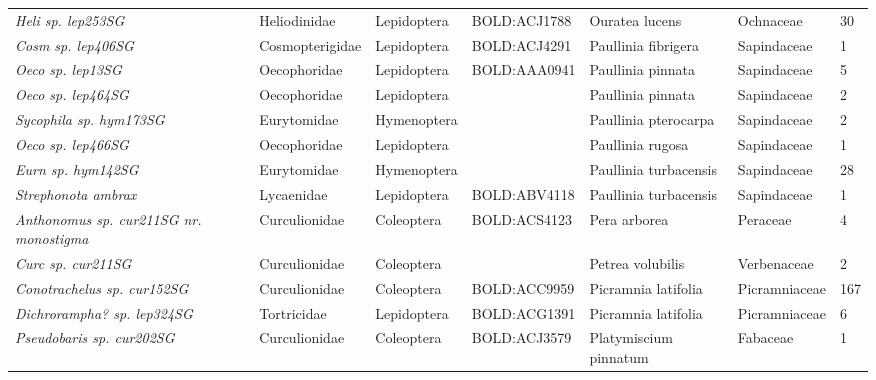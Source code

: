 \documentclass[11pt]{article}
\begin{document}
\begin{landscape}
\begin{longtable}{@{}lllllll@{}}
\textit{Heli sp. lep253SG}                            & Heliodinidae    & Lepidoptera  & BOLD:ACJ1788 & Ouratea lucens                     & Ochnaceae        & 30    \\
\textit{Cosm sp. lep406SG}                            & Cosmopterigidae & Lepidoptera  & BOLD:ACJ4291 & Paullinia fibrigera                & Sapindaceae      & 1     \\
\textit{Oeco sp. lep13SG}                             & Oecophoridae    & Lepidoptera  & BOLD:AAA0941 & Paullinia pinnata                  & Sapindaceae      & 5     \\
\textit{Oeco sp. lep464SG}                            & Oecophoridae    & Lepidoptera  &              & Paullinia pinnata                  & Sapindaceae      & 2     \\
\textit{Sycophila sp. hym173SG}                       & Eurytomidae     & Hymenoptera  &              & Paullinia pterocarpa               & Sapindaceae      & 2     \\
\textit{Oeco sp. lep466SG}                            & Oecophoridae    & Lepidoptera  &              & Paullinia rugosa                   & Sapindaceae      & 1     \\
\textit{Eurn sp. hym142SG}                            & Eurytomidae     & Hymenoptera  &              & Paullinia turbacensis              & Sapindaceae      & 28    \\
\textit{Strephonota ambrax}                           & Lycaenidae      & Lepidoptera  & BOLD:ABV4118 & Paullinia turbacensis              & Sapindaceae      & 1     \\
\textit{Anthonomus sp. cur211SG nr. monostigma}       & Curculionidae   & Coleoptera   & BOLD:ACS4123 & Pera arborea                       & Peraceae         & 4     \\
\textit{Curc sp. cur211SG}                            & Curculionidae   & Coleoptera   &              & Petrea volubilis                   & Verbenaceae      & 2     \\
\textit{Conotrachelus sp. cur152SG}                   & Curculionidae   & Coleoptera   & BOLD:ACC9959 & Picramnia latifolia                & Picramniaceae    & 167   \\
\textit{Dichrorampha? sp. lep324SG}                   & Tortricidae     & Lepidoptera  & BOLD:ACG1391 & Picramnia latifolia                & Picramniaceae    & 6     \\
\textit{Pseudobaris sp. cur202SG}                     & Curculionidae   & Coleoptera   & BOLD:ACJ3579 & Platymiscium pinnatum              & Fabaceae         & 1     \\

\end{longtable}
\end{landscape}
\end{document}
